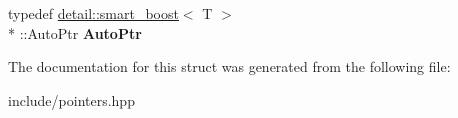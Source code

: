 \begin{DoxyCompactItemize}
\item 
\hypertarget{structcore_1_1pointers_1_1smart_a81575934680d792c887e75a87c59f7b8}{typedef \hyperlink{structcore_1_1pointers_1_1detail_1_1smart__boost}{detail\-::smart\-\_\-boost}$<$ T $>$\\*
\-::Auto\-Ptr {\bfseries Auto\-Ptr}}\label{structcore_1_1pointers_1_1smart_a81575934680d792c887e75a87c59f7b8}

\end{DoxyCompactItemize}


The documentation for this struct was generated from the following file\-:\begin{DoxyCompactItemize}
\item 
include/pointers.\-hpp\end{DoxyCompactItemize}

